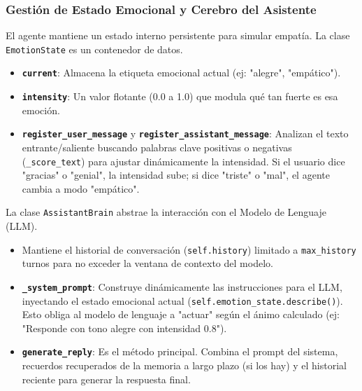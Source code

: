 \documentclass[letterpaper,12pt]{article}
\begin{document}
\subsubsection{Gestión de Estado Emocional y Cerebro del Asistente}

El agente mantiene un estado interno persistente para simular empatía.
La clase \texttt{EmotionState} es un contenedor de datos.
\begin{itemize}
    \item \textbf{\texttt{current}}: Almacena la etiqueta emocional actual (ej: "alegre", "empático").
    \item \textbf{\texttt{intensity}}: Un valor flotante (0.0 a 1.0) que modula qué tan fuerte es esa emoción.
    \item \textbf{\texttt{register\_user\_message}} y \textbf{\texttt{register\_assistant\_message}}: Analizan el texto entrante/saliente buscando palabras clave positivas o negativas (\texttt{\_score\_text}) para ajustar dinámicamente la intensidad. Si el usuario dice "gracias" o "genial", la intensidad sube; si dice "triste" o "mal", el agente cambia a modo "empático".
\end{itemize}

La clase \texttt{AssistantBrain} abstrae la interacción con el Modelo de Lenguaje (LLM).
\begin{itemize}
    \item Mantiene el historial de conversación (\texttt{self.history}) limitado a \texttt{max\_history} turnos para no exceder la ventana de contexto del modelo.
    \item \textbf{\texttt{\_system\_prompt}}: Construye dinámicamente las instrucciones para el LLM, inyectando el estado emocional actual (\texttt{self.emotion\_state.describe()}). Esto obliga al modelo de lenguaje a "actuar" según el ánimo calculado (ej: "Responde con tono alegre con intensidad 0.8").
    \item \textbf{\texttt{generate\_reply}}: Es el método principal. Combina el prompt del sistema, recuerdos recuperados de la memoria a largo plazo (si los hay) y el historial reciente para generar la respuesta final.
\end{itemize}
\end{document}
